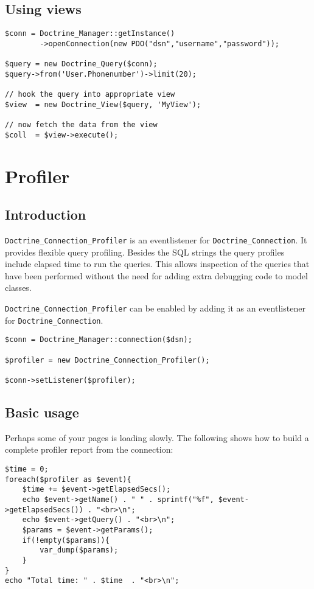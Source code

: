 \documentclass[11pt,a4paper]{report}
\begin{document}
\subsection{Using views}
\begin{verbatim}
$conn = Doctrine_Manager::getInstance()
        ->openConnection(new PDO("dsn","username","password"));

$query = new Doctrine_Query($conn);
$query->from('User.Phonenumber')->limit(20);

// hook the query into appropriate view
$view  = new Doctrine_View($query, 'MyView');

// now fetch the data from the view
$coll  = $view->execute();
\end{verbatim}

\section{Profiler}
\subsection{Introduction}
\texttt{Doctrine\_Connection\_Profiler} is an eventlistener for \texttt{Doctrine\_Connection}. It provides flexible query profiling. Besides the SQL strings the query profiles include elapsed time to run the queries. This allows inspection of the queries that have been performed without the need for adding extra debugging code to model classes.

\texttt{Doctrine\_Connection\_Profiler} can be enabled by adding it as an eventlistener for \texttt{Doctrine\_Connection}.

\begin{verbatim}
$conn = Doctrine_Manager::connection($dsn);

$profiler = new Doctrine_Connection_Profiler();

$conn->setListener($profiler);
\end{verbatim}

\subsection{Basic usage}
Perhaps some of your pages is loading slowly. The following shows how to build a complete profiler report from the connection:

\begin{verbatim}
$time = 0;
foreach($profiler as $event){
    $time += $event->getElapsedSecs();
    echo $event->getName() . " " . sprintf("%f", $event->getElapsedSecs()) . "<br>\n";
    echo $event->getQuery() . "<br>\n";
    $params = $event->getParams();
    if(!empty($params)){
        var_dump($params);
    }
}
echo "Total time: " . $time  . "<br>\n";
\end{verbatim}
\end{document}
